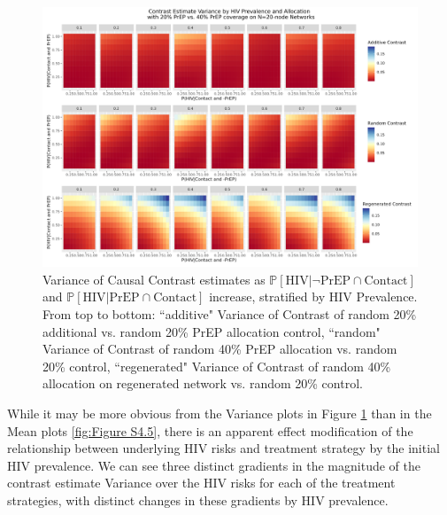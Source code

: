 \documentclass{article}
\theoremstyle{definition}
\begin{document}
\begin{figure}[H]
    \centering
    \includegraphics[width=\linewidth]{Corrected Figures/HIV Prevalence Variance Plot.png}
    \caption{Variance of Causal Contrast estimates as $\mathbb{P}\left[\text{HIV} \vert \neg \text{PrEP} \cap \text{Contact}\right]$ and $\mathbb{P}\left[\text{HIV} \vert \text{PrEP} \cap \text{Contact}\right]$ increase,  stratified by HIV Prevalence. From top to bottom: ``additive" Variance of Contrast of random 20\% additional vs. random 20\% PrEP allocation control, ``random" Variance of Contrast of random 40\% PrEP allocation vs. random 20\% control, ``regenerated" Variance of Contrast of random 40\% allocation on regenerated network vs. random 20\% control.}
    \label{fig:Figure S4.6}
\end{figure}

While it may be more obvious from the Variance plots in Figure \ref{fig:Figure S4.6} than in the Mean plots \ref{fig:Figure S4.5}, there is an apparent effect modification of the relationship between underlying HIV risks and treatment strategy by the initial HIV prevalence. We can see three distinct gradients in the magnitude of the contrast estimate Variance over the HIV risks for each of the treatment strategies, with distinct changes in these gradients by HIV prevalence. 
\end{document}
